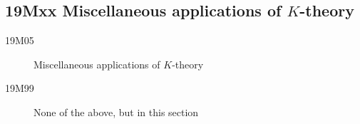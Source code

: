 \subsection*{19Mxx  Miscellaneous applications of $K$-theory }\label{19Mxx}
\begin{description}
\item [19M05]\label{19M05} Miscellaneous applications of $K$-theory
\item [19M99]\label{19M99} None of the above, but in this section
\end{description}
